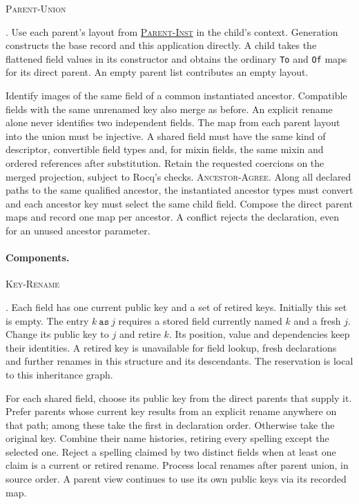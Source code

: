 \documentclass{article}
\newcommand{\ttt}[1]{\texttt{#1}}
\newcommand{\rdefn}[1]{\hypertarget{rule-#1}{\textsc{#1}}}
\newcommand{\ruse}[1]{\hyperlink{rule-#1}{\textsc{#1}}}
\begin{document}
\rdefn{Parent-Union}. Use each parent's layout from \ruse{Parent-Inst}
in the child's context.
Generation constructs the base record and this application directly.
A child takes the flattened field values in its constructor and obtains
the ordinary \ttt{To} and \ttt{Of} maps for its direct parent.
An empty parent list contributes an empty layout.

Identify images of the same field of a common instantiated ancestor.
Compatible fields with the same unrenamed key also merge as before.
An explicit rename alone never identifies two independent fields.
The map from each parent layout into the union must be injective.
A shared field must have the same kind of
descriptor, convertible field types and, for mixin fields, the same mixin
and ordered references after substitution. Retain the requested coercions
on the merged projection, subject to Rocq's checks.
\rdefn{Ancestor-Agree}. Along all declared paths to the same qualified
ancestor, the instantiated ancestor types must convert and each ancestor
key must select the same child field. Compose the direct parent maps and
record one map per ancestor.
A conflict rejects the declaration, even for an unused ancestor parameter.

\paragraph{Components.}

\rdefn{Key-Rename}. Each field has one current public key and a set of
retired keys. Initially this set is empty. The entry $k\ \ttt{as}\ j$
requires a stored field currently named $k$ and a fresh $j$. Change its
public key to $j$ and retire $k$. Its position, value and dependencies
keep their identities. A retired key is unavailable for field lookup,
fresh declarations and further renames in this structure and its
descendants. The reservation is local to this inheritance graph.

For each shared field, choose its public key from the direct parents
that supply it. Prefer parents whose current key results from an explicit
rename anywhere on that path; among these take the first in declaration
order. Otherwise take the original key. Combine their name histories,
retiring every spelling except the selected one. Reject a spelling
claimed by two distinct fields when at least one claim is a current or
retired rename. Process local renames after parent union, in source order.
A parent view continues to use its own public keys via its recorded map.
\end{document}
